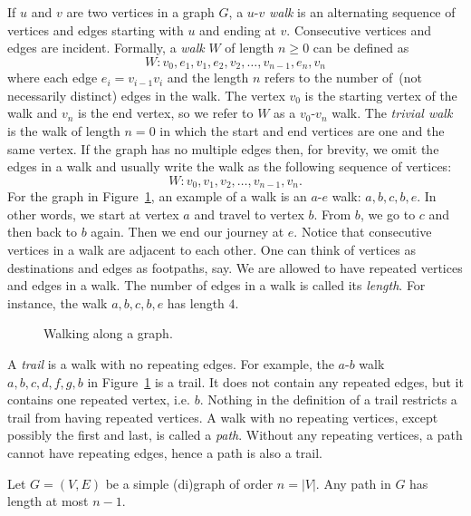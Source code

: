 If $u$ and $v$ are two vertices in a graph $G$, a $u$-$v$
\emph{walk} is an alternating sequence of vertices and
edges starting with $u$ and ending at $v$. Consecutive vertices and
edges are incident. Formally, a \emph{walk} $W$ of length
$n \geq 0$ can be defined as
\[
W: v_0, e_1, v_1, e_2, v_2, \dots, v_{n-1}, e_n, v_n
\]
where each edge $e_i = v_{i-1} v_i$ and the length
$n$ refers to the number of~(not necessarily distinct) edges in the
walk. The vertex $v_0$ is the starting vertex of the walk and $v_n$ is
the end vertex, so we refer to $W$ as a $v_0$-$v_n$ walk. The
\emph{trivial walk} is the walk of length $n = 0$
in which the start and end vertices are one and the same vertex. If
the graph has no multiple edges then, for brevity, we omit the edges
in a walk and usually write the walk as the following sequence of
vertices:
\[
W: v_0, v_1, v_2, \dots, v_{n-1}, v_n.
\]
For the graph in Figure~\ref{fig:introduction:types_of_walks}, an
example of a walk is an $a$-$e$ walk: $a, b, c, b, e$. In other words,
we start at vertex $a$ and travel to vertex $b$. From $b$, we go to
$c$ and then back to $b$ again. Then we end our journey at $e$. Notice
that consecutive vertices in a walk are adjacent to each other. One
can think of vertices as destinations and edges as footpaths, say. We
are allowed to have repeated vertices and edges in a walk. The number
of edges in a walk is called its \emph{length}. For
instance, the walk $a, b, c, b, e$ has length $4$.

\begin{figure}[!htbp]
\centering

\caption{Walking along a graph.}
\label{fig:introduction:types_of_walks}
\end{figure}

A \emph{trail} is a walk with no repeating edges. For
example, the $a$-$b$ walk $a, b, c, d, f, g, b$ in
Figure~\ref{fig:introduction:types_of_walks} is a trail. It does not
contain any repeated edges, but it contains one repeated vertex,
i.e. $b$. Nothing in the definition of a trail restricts a trail from
having repeated vertices. A walk with no repeating vertices, except
possibly the first and last, is called a \emph{path}.
Without any repeating vertices, a path cannot have repeating edges,
hence a path is also a trail.

\begin{proposition}
\label{prop:introduction:any_path_has_length_at_most_n_minus_1}
Let $G = (V, E)$ be a simple (di)graph of order $n = |V|$. Any path in $G$
has length at most $n - 1$.
\end{proposition}

